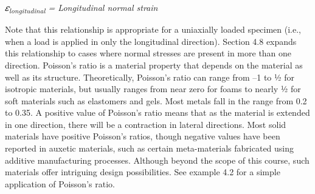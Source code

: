 \documentclass[
  letterpaper,
  DIV=11,
  numbers=noendperiod]{scrreprt}
\theoremstyle{definition}
\theoremstyle{remark}
\begin{document}
\emph{𝜀\textsubscript{longitudinal} = Longitudinal normal strain}

Note that this relationship is appropriate for a uniaxially loaded
specimen (i.e., when a load is applied in only the longitudinal
direction). Section 4.8 expands this relationship to cases where normal
stresses are present in more than one direction. Poisson's ratio is a
material property that depends on the material as well as its structure.
Theoretically, Poisson's ratio can range from --1 to ½ for isotropic
materials, but usually ranges from near zero for foams to nearly ½ for
soft materials such as elastomers and gels. Most metals fall in the
range from 0.2 to 0.35. A positive value of Poisson's ratio means that
as the material is extended in one direction, there will be a
contraction in lateral directions. Most solid materials have positive
Poisson's ratios, though negative values have been reported in auxetic
materials, such as certain meta-materials fabricated using additive
manufacturing processes. Although beyond the scope of this course, such
materials offer intriguing design possibilities. See example 4.2 for a
simple application of Poisson's ratio.
\end{document}
